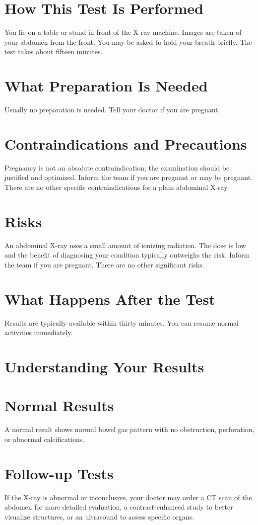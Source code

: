 \section*{How This Test Is Performed}
You lie on a table or stand in front of the X-ray machine. Images are taken of your abdomen from the front. You may be asked to hold your breath briefly. The test takes about fifteen minutes.

\section*{What Preparation Is Needed}
Usually no preparation is needed. Tell your doctor if you are pregnant.

\section*{Contraindications and Precautions}
Pregnancy is not an absolute contraindication; the examination should be justified and optimized. Inform the team if you are pregnant or may be pregnant. There are no other specific contraindications for a plain abdominal X-ray.

\section*{Risks}
An abdominal X-ray uses a small amount of ionizing radiation. The dose is low and the benefit of diagnosing your condition typically outweighs the risk. Inform the team if you are pregnant. There are no other significant risks.

\section*{What Happens After the Test}
Results are typically available within thirty minutes. You can resume normal activities immediately.

\section*{Understanding Your Results}

\section*{Normal Results}
A normal result shows normal bowel gas pattern with no obstruction, perforation, or abnormal calcifications.
\section*{Follow-up Tests}
If the X-ray is abnormal or inconclusive, your doctor may order a CT scan of the abdomen for more detailed evaluation, a contrast-enhanced study to better visualize structures, or an ultrasound to assess specific organs.
\clearpage
